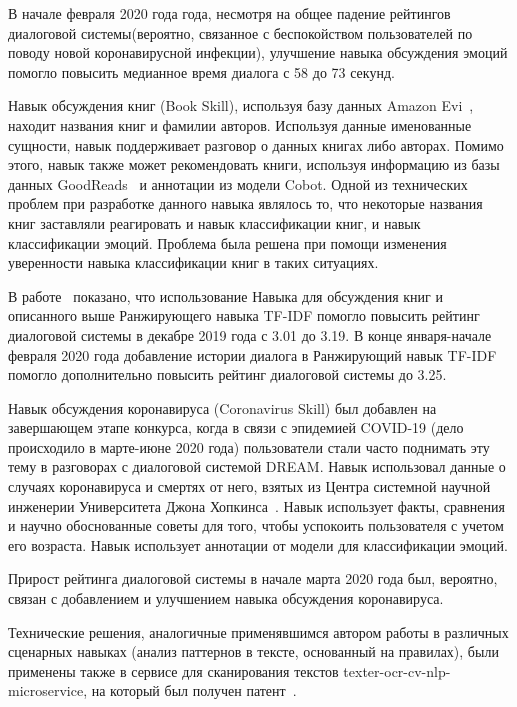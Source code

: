 В начале февраля 2020 года года, несмотря на общее падение рейтингов диалоговой системы(вероятно, связанное  с беспокойством пользователей по поводу новой коронавирусной инфекции), улучшение навыка обсуждения эмоций помогло повысить медианное время диалога с 58 до 73 секунд.

Навык обсуждения книг (Book Skill), используя базу данных Amazon Evi~\cite{na_website_nds}, находит названия книг и фамилии авторов. Используя данные именованные сущности, навык поддерживает разговор о данных книгах либо авторах. Помимо этого, навык также может рекомендовать книги, используя информацию из базы данных GoodReads~\cite{na_website_ndt} и аннотации из модели Cobot. Одной из технических проблем при разработке данного навыка являлось то, что некоторые названия книг заставляли реагировать и навык классификации книг, и навык классификации эмоций. Проблема была решена при помощи изменения уверенности навыка классификации книг в таких ситуациях.

В работе~\cite{dream1} показано, что использование Навыка для обсуждения книг и описанного выше Ранжирующего навыка TF-IDF помогло повысить рейтинг диалоговой системы в декабре 2019 года с 3.01 до 3.19.  В конце января-начале февраля 2020 года добавление истории диалога в Ранжирующий навык TF-IDF помогло дополнительно повысить рейтинг диалоговой системы до 3.25.

Навык обсуждения коронавируса (Coronavirus Skill) был добавлен на завершающем этапе конкурса, когда в связи с эпидемией COVID-19 (дело происходило в марте-июне 2020 года) пользователи стали часто поднимать эту тему в разговорах с диалоговой системой DREAM. Навык использовал данные о случаях коронавируса и смертях от него, взятых из Центра системной научной инженерии Университета Джона Хопкинса~\cite{na_website_ndr}. Навык использует факты, сравнения и научно обоснованные советы для того, чтобы успокоить пользователя с учетом его возраста. Навык использует аннотации от модели для классификации эмоций.

 Прирост рейтинга диалоговой системы в начале марта 2020 года был, вероятно, связан с добавлением и улучшением навыка обсуждения коронавируса.

Технические решения, аналогичные применявшимся автором работы в различных сценарных навыках (анализ паттернов в тексте, основанный на правилах), были применены также в сервисе для сканирования текстов texter-ocr-cv-nlp-microservice, на который был получен патент~\cite{Дуплякин_Дмитрий_Ондар_Ушаков_2021}.

